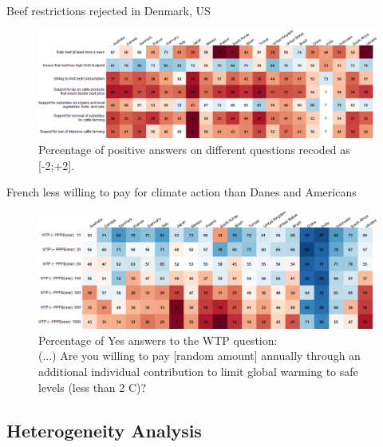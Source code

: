 \begin{framefont}{\small}
\begin{frame}{Beef restrictions rejected in Denmark, US}%
\begin{figure}[h!]
\caption{Percentage of positive answers on different questions recoded as [-2;+2].}
\includegraphics[width=\paperwidth]{../figures/country_comparison/beef_positive_countries.png} 
\end{figure}
\end{frame}  %

\begin{frame}{French less willing to pay for climate action than Danes and Americans}%
\begin{figure}[h!]
\caption{Percentage of Yes answers to the WTP question: \\
(...) Are you willing to pay [random amount] annually through an additional individual contribution to limit global warming to safe levels (less than 2 \degree{}C)?}
\includegraphics[width=\paperwidth]{../figures/country_comparison/wtp_positive_countries.png} 
\end{figure}
\end{frame} 


\subsection{Heterogeneity Analysis}


\end{framefont}
